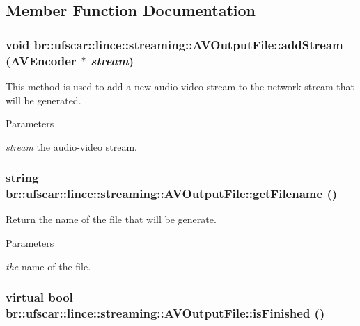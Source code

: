 \subsection{Member Function Documentation}
\hypertarget{classbr_1_1ufscar_1_1lince_1_1streaming_1_1AVOutputFile_a0357f82095145d9842bb02ecdd186152}{
\subsubsection[{addStream}]{\setlength{\rightskip}{0pt plus 5cm}void br::ufscar::lince::streaming::AVOutputFile::addStream ({\bf AVEncoder} $\ast$ {\em stream})}}
\label{classbr_1_1ufscar_1_1lince_1_1streaming_1_1AVOutputFile_a0357f82095145d9842bb02ecdd186152}


This method is used to add a new audio-\/video stream to the network stream that will be generated. 


\begin{DoxyParams}{Parameters}
\item[{\em stream}]the audio-\/video stream. \end{DoxyParams}
\hypertarget{classbr_1_1ufscar_1_1lince_1_1streaming_1_1AVOutputFile_ada28bb7fce4192d132a33becd5a4ab9d}{
\subsubsection[{getFilename}]{\setlength{\rightskip}{0pt plus 5cm}string br::ufscar::lince::streaming::AVOutputFile::getFilename ()}}
\label{classbr_1_1ufscar_1_1lince_1_1streaming_1_1AVOutputFile_ada28bb7fce4192d132a33becd5a4ab9d}


Return the name of the file that will be generate. 


\begin{DoxyParams}{Parameters}
\item[{\em the}]name of the file. \end{DoxyParams}
\hypertarget{classbr_1_1ufscar_1_1lince_1_1streaming_1_1AVOutputFile_a38f6acb7513f621bb7322bb31929fda0}{
\subsubsection[{isFinished}]{\setlength{\rightskip}{0pt plus 5cm}virtual bool br::ufscar::lince::streaming::AVOutputFile::isFinished ()}}
\label{classbr_1_1ufscar_1_1lince_1_1streaming_1_1AVOutputFile_a38f6acb7513f621bb7322bb31929fda0}


